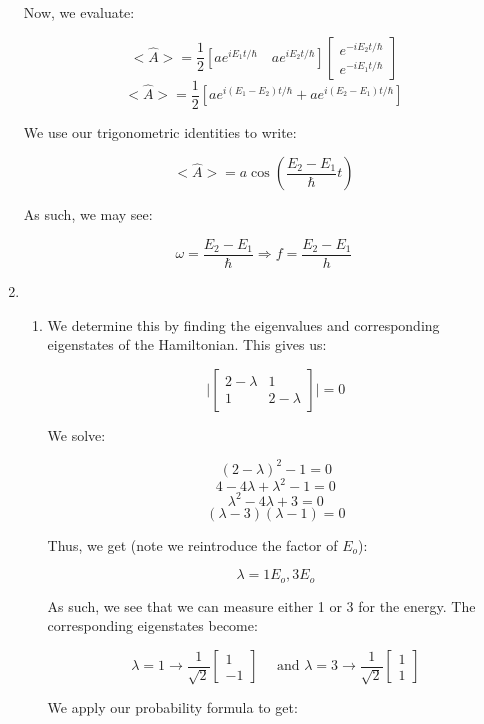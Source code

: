 \begin{enumerate}
    Now, we evaluate:

    $$<\hat{A}>=\frac{1}{2}\left[ ae^{iE_1t/\hbar}\quad ae^{iE_2t/\hbar} \right]\left[ \begin{matrix} e^{-iE_2t/\hbar}\\ e^{-iE_1t/\hbar} \end{matrix}\right]$$
    $$<\hat{A}>=\frac{1}{2}\left[ ae^{i(E_1-E_2)t/\hbar}+ae^{i(E_2-E_1)t/\hbar} \right]$$

    We use our trigonometric identities to write:

    $$<\hat{A}>=a\cos\left( \frac{E_2-E_1}{\hbar}t \right)$$

    As such, we may see:

    $$\boxed{\omega=\frac{E_2-E_1}{\hbar}\Rightarrow f=\frac{E_2-E_1}{h}}$$

  \item

    \begin{enumerate}

      \item We determine this by finding the eigenvalues and corresponding eigenstates of the Hamiltonian. This gives us:

        $$\Big|\left[ \begin{matrix} 2-\lambda & 1\\ 1 & 2-\lambda\end{matrix} \right]\Big|=0$$

        We solve:

        $$(2-\lambda)^2-1=0$$
        $$4-4\lambda+\lambda^2-1=0$$
        $$\lambda^2-4\lambda+3=0$$
        $$(\lambda-3)(\lambda-1)=0$$

        Thus, we get (note we reintroduce the factor of $E_o$):

        $$\boxed{\lambda=1E_o,3E_o}$$

        As such, we see that we can measure either 1 or 3 for the energy. The corresponding eigenstates become:

        $$\boxed{\lambda=1\to\frac{1}{\sqrt{2}}\left[ \begin{matrix} 1\\-1\end{matrix} \right]\quad\text{ and }\lambda=3\to\frac{1}{\sqrt{2}}\left[ \begin{matrix} 1\\1\end{matrix} \right]}$$

        We apply our probability formula to get:


\end{enumerate}
\end{enumerate}

